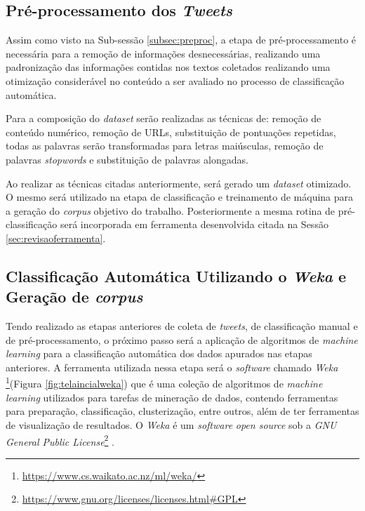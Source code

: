 \subsection{Pré-processamento dos \textit{Tweets}}
Assim como visto na Sub-sessão \ref{subsec:preproc}, a etapa de pré-processamento é necessária para a remoção de informações desnecessárias, realizando uma padronização das informações contidas nos textos coletados realizando uma otimização considerável no conteúdo a ser avaliado no processo de classificação automática. 

Para a composição do \textit{dataset} serão realizadas as técnicas de: remoção de conteúdo numérico, remoção de URLs, substituição de pontuações repetidas, todas as palavras serão transformadas para letras maiúsculas, remoção de palavras \textit{stopwords} e substituição de palavras alongadas. 

Ao realizar as técnicas citadas anteriormente, será gerado um \textit{dataset} otimizado. O mesmo será utilizado na etapa de classificação e treinamento de máquina para a geração do \textit{corpus} objetivo do trabalho. Posteriormente a mesma rotina de pré-classificação será incorporada em ferramenta desenvolvida citada na Sessão \ref{sec:revisaoferramenta}.

\subsection{Classificação Automática Utilizando o \textit{Weka} e Geração de \textit{corpus}}

Tendo realizado as etapas anteriores de coleta de \textit{tweets}, de classificação manual e de pré-processamento, o próximo passo será a aplicação de algoritmos de \textit{machine learning} para a classificação automática dos dados apurados nas etapas anteriores. A ferramenta utilizada nessa etapa será o \textit{software} chamado \textit{Weka} \footnote{\url{https://www.cs.waikato.ac.nz/ml/weka/}}(Figura \ref{fig:telaincialweka}) que é uma coleção de algoritmos de \textit{machine learning} utilizados para tarefas de mineração de dados, contendo ferramentas para preparação, classificação, clusterização, entre outros, além de ter ferramentas de visualização de resultados. O \textit{Weka} é um \textit{software} \textit{open source} sob a \textit{GNU General Public License}\footnote{\url{https://www.gnu.org/licenses/licenses.html\#GPL}} \cite{weka_2018}.

